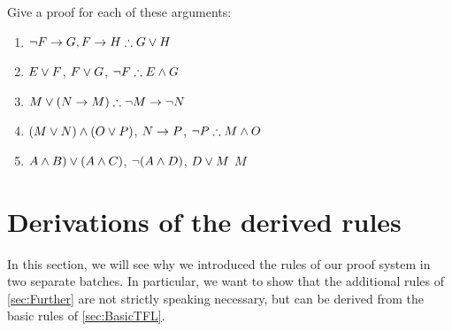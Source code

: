 \begin{practiceproblems}
\problempart
Give a proof for each of these arguments:
\begin{enumerate}
			\item $\enot F\eif G, F\eif H \therefore G\eor H$
\item $E\vee F$, $F\vee G$, $\enot F \therefore E \eand G$
\item $M\eor(N\eif M) \therefore \enot M \eif \enot N$
\item $(M \vee N) \mathbin{\wedge} (O \vee P)$, $N \rightarrow P$, $\enot P \therefore M\eand O$
\item $A\mathbin{\wedge} B)\vee(A\mathbin{\wedge} C)$, $\neg(A\mathbin{\wedge} D)$, $D\vee M$ \therefore $M$
\end{enumerate}



\end{practiceproblems}

\chapter{Derivations of the derived rules}\label{sec:Derived}

In this section, we will see why we introduced the rules of our proof system in two separate batches. In particular, we want to show that the additional rules of \cref{sec:Further} are not strictly speaking necessary, but can be derived from the basic rules of \cref{sec:BasicTFL}.

